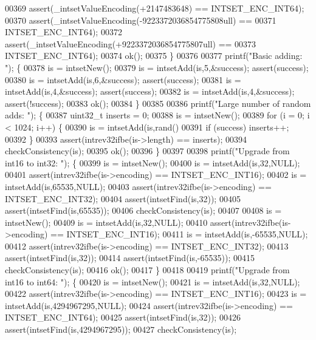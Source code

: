 \begin{DoxyCode}
{{{00369         assert(\_intsetValueEncoding(+2147483648) == INTSET\_ENC\_INT64);
00370         assert(\_intsetValueEncoding(-9223372036854775808ull) ==
00371                     INTSET\_ENC\_INT64);
00372         assert(\_intsetValueEncoding(+9223372036854775807ull) ==
00373                     INTSET\_ENC\_INT64);
00374         ok();
00375     \}
00376 
00377     printf(\textcolor{stringliteral}{"Basic adding: "}); \{
00378         is = intsetNew();
00379         is = intsetAdd(is,5,&success); assert(success);
00380         is = intsetAdd(is,6,&success); assert(success);
00381         is = intsetAdd(is,4,&success); assert(success);
00382         is = intsetAdd(is,4,&success); assert(!success);
00383         ok();
00384     \}
00385 
00386     printf(\textcolor{stringliteral}{"Large number of random adds: "}); \{
00387         uint32\_t inserts = 0;
00388         is = intsetNew();
00389         \textcolor{keywordflow}{for} (i = 0; i < 1024; i++) \{
00390             is = intsetAdd(is,rand()%
00391             \textcolor{keywordflow}{if} (success) inserts++;
00392         \}
00393         assert(intrev32ifbe(is->length) == inserts);
00394         checkConsistency(is);
00395         ok();
00396     \}
00397 
00398     printf(\textcolor{stringliteral}{"Upgrade from int16 to int32: "}); \{
00399         is = intsetNew();
00400         is = intsetAdd(is,32,NULL);
00401         assert(intrev32ifbe(is->encoding) == INTSET\_ENC\_INT16);
00402         is = intsetAdd(is,65535,NULL);
00403         assert(intrev32ifbe(is->encoding) == INTSET\_ENC\_INT32);
00404         assert(intsetFind(is,32));
00405         assert(intsetFind(is,65535));
00406         checkConsistency(is);
00407 
00408         is = intsetNew();
00409         is = intsetAdd(is,32,NULL);
00410         assert(intrev32ifbe(is->encoding) == INTSET\_ENC\_INT16);
00411         is = intsetAdd(is,-65535,NULL);
00412         assert(intrev32ifbe(is->encoding) == INTSET\_ENC\_INT32);
00413         assert(intsetFind(is,32));
00414         assert(intsetFind(is,-65535));
00415         checkConsistency(is);
00416         ok();
00417     \}
00418 
00419     printf(\textcolor{stringliteral}{"Upgrade from int16 to int64: "}); \{
00420         is = intsetNew();
00421         is = intsetAdd(is,32,NULL);
00422         assert(intrev32ifbe(is->encoding) == INTSET\_ENC\_INT16);
00423         is = intsetAdd(is,4294967295,NULL);
00424         assert(intrev32ifbe(is->encoding) == INTSET\_ENC\_INT64);
00425         assert(intsetFind(is,32));
00426         assert(intsetFind(is,4294967295));
00427         checkConsistency(is);
}}}
\end{DoxyCode}
